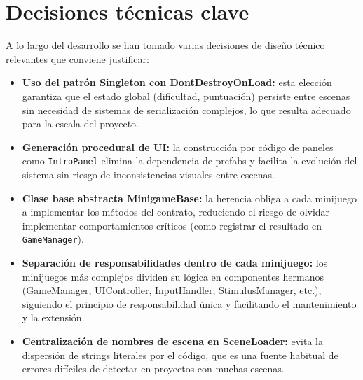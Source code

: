 \documentclass[12pt, a4paper]{report}
\begin{document}
\section{Decisiones técnicas clave}

A lo largo del desarrollo se han tomado varias decisiones de diseño técnico
relevantes que conviene justificar:

\begin{itemize}
  \item \textbf{Uso del patrón Singleton con DontDestroyOnLoad:} esta elección
    garantiza que el estado global (dificultad, puntuación) persiste entre
    escenas sin necesidad de sistemas de serialización complejos, lo que resulta
    adecuado para la escala del proyecto.
  \item \textbf{Generación procedural de UI:} la construcción por código de
    paneles como \texttt{IntroPanel} elimina la dependencia de prefabs y facilita
    la evolución del sistema sin riesgo de inconsistencias visuales entre escenas.
  \item \textbf{Clase base abstracta MinigameBase:} la herencia obliga a cada
    minijuego a implementar los métodos del contrato, reduciendo el riesgo de
    olvidar implementar comportamientos críticos (como registrar el resultado en
    \texttt{GameManager}).
  \item \textbf{Separación de responsabilidades dentro de cada minijuego:}
    los minijuegos más complejos dividen su lógica en componentes hermanos
    (GameManager, UIController, InputHandler, StimulusManager, etc.),
    siguiendo el principio de responsabilidad única y facilitando el
    mantenimiento y la extensión.
  \item \textbf{Centralización de nombres de escena en SceneLoader:}
    evita la dispersión de strings literales por el código, que es una fuente
    habitual de errores difíciles de detectar en proyectos con muchas escenas.
\end{itemize}

{\setlength{\bibsep}{4pt}


}
\end{document}
